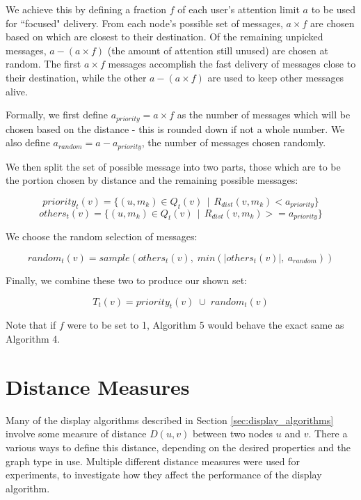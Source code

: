 \documentclass[bsc,frontabs,twoside,singlespacing,parskip,deptreport]{infthesis}     %
\begin{document}
We achieve this by defining a fraction $f$ of each user's attention limit $a$ to be used for ``focused" delivery. From each node's possible set of messages, $a \times f$ are chosen based on which are closest to their destination. Of the remaining unpicked messages, $a - (a \times f)$ (the amount of attention still unused) are chosen at random. The first $a \times f$ messages accomplish the fast delivery of messages close to their destination, while the other $a - (a \times f)$ are used to keep other messages alive.

Formally, we first define $a_{priority} = a \times f$ as the number of messages which will be chosen based on the distance - this is rounded down if not a whole number. We also define $a_{random} = a - a_{priority}$, the number of messages chosen randomly.

We then split the set of possible message into two parts, those which are to be the portion chosen by distance and the remaining possible messages:

\begin{equation}
priority_{t}(v) = \{ (u, m_{k}) \in Q_{t}(v) \:\: | \:\: R_{dist}(v, m_{k}) < a_{priority} \}
\end{equation}
\begin{equation}
others_{t}(v) = \{ (u, m_{k}) \in Q_{t}(v) \:\: | \:\: R_{dist}(v, m_{k}) >= a_{priority} \}
\end{equation}

We choose the random selection of messages:

\begin{equation}
random_{t}(v) = sample(others_{t}(v), \; min(|others_{t}(v)|, \: a_{random}))
\end{equation}

Finally, we combine these two to produce our shown set:

\begin{equation}
T_{t}(v) = priority_{t}(v) \; \cup \; random_{t}(v)
\end{equation}

Note that if $f$ were to be set to 1, Algorithm 5 would behave the exact same as Algorithm 4.


\section{Distance Measures} \label{sec:distance_measures}
Many of the display algorithms described in Section \ref{sec:display_algorithms} involve some measure of distance $D(u, v)$ between two nodes $u$ and $v$. There a various ways to define this distance, depending on the desired properties and the graph type in use. Multiple different distance measures were used for experiments, to investigate how they affect the performance of the display algorithm.
\end{document}
